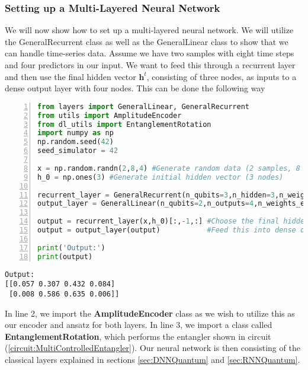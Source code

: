 \subsubsection{Setting up a Multi-Layered Neural Network}
\label{subsubsec:MethodsDeepNeuralNetwork}
We will now show how to set up a multi-layered neural network. We will utilize the GeneralRecurrent class as well as the GeneralLinear class to show that we can handle time-series data. Assume we have two samples with eight time steps and four predictors in our input. We want to feed this through a recurrent layer and then use the final hidden vector $\boldsymbol{h}^{t}$, consisting of three nodes, as inputs to a dense output layer with four nodes. This can be done the following way
\begin{lstlisting}[language=Python,numbers=left]
from layers import GeneralLinear, GeneralRecurrent
from utils import AmplitudeEncoder
from dl_utils import EntanglementRotation
import numpy as np
np.random.seed(42)
seed_simulator = 42

x = np.random.randn(2,8,4) #Generate random data (2 samples, 8 time steps, 4 predictors)
h_0 = np.ones(3) #Generate initial hidden vector (3 nodes)

recurrent_layer = GeneralRecurrent(n_qubits=3,n_hidden=3,n_weights_ent=0,n_weights_a=7,bias=True,U_enc=AmplitudeEncoder(),U_a=AmplitudeEncoder(inverse=True),U_ent=EntanglementRotation(zero_condition=True),seed_simulator=seed_simulator)
output_layer = GeneralLinear(n_qubits=2,n_outputs=4,n_weights_ent=0,n_weights_a=4,bias=True,U_enc=AmplitudeEncoder(),U_a=AmplitudeEncoder(inverse=True),U_ent=EntanglementRotation(zero_condition=True),seed_simulator=seed_simulator+1)

output = recurrent_layer(x,h_0)[:,-1,:] #Choose the final hidden vector from recurrent layer
output = output_layer(output) 			#Feed this into dense output layer

print('Output:')
print(output)
\end{lstlisting}
\begin{verbatim}
Output:
[[0.057 0.307 0.432 0.084]
 [0.008 0.586 0.635 0.006]]
\end{verbatim}
In line 2, we import the \textbf{AmplitudeEncoder} class as we wish to utilize this as our encoder and ansatz for both layers. In line 3, we import a class called \textbf{EntanglementRotation}, which performs the entangler shown in circuit (\ref{circuit:MultiControlledEntangler}). Our neural network is then consisting of the classical layers explained in sections \ref{sec:DNNQuantum} and \ref{sec:RNNQuantum}.

